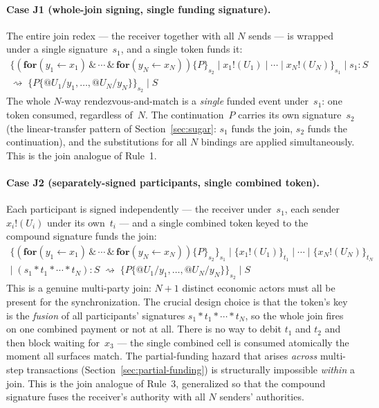 \documentclass[11pt,a4paper]{article}
\makeatletter
\newcommand{\Par}{\mathbin{|}}
\newcommand{\forc}{\mathbf{for}}
\newcommand{\send}[2]{#1 !\!\left( #2 \right)}
\newcommand{\recv}[3]{\forc\!\left( #1 \leftarrow #2 \right) #3}
\newcommand{\quot}[1]{@#1}
\newcommand{\signed}[2]{\{#1\}_{#2}}
\newcommand{\comp}{\mathbin{*}}
\newcommand{\red}{\rightsquigarrow}
\makeatother
\begin{document}
\paragraph{Case J1 (whole-join signing, single funding signature).}
The entire join redex --- the receiver together with all $N$
sends --- is wrapped under a single signature~$s_1$, and a
single token funds it:
\begin{multline}
  \signed{
    (\recv{y_1}{x_1}{} \,\&\, \cdots \,\&\, \recv{y_N}{x_N}{})
    \signed{P}{s_2}
    \Par \send{x_1}{U_1} \Par \cdots \Par \send{x_N}{U_N}
  }{s_1}
  \Par s_1 : S
  \\
  \red\;
  \signed{P\{\quot{U_1}/y_1, \ldots, \quot{U_N}/y_N\}}{s_2}
  \Par S
  \label{eq:join-J1}
\end{multline}
The whole $N$-way rendezvous-and-match is a \emph{single}
funded event under~$s_1$: one token consumed, regardless
of~$N$.  The continuation~$P$ carries its own
signature~$s_2$ (the linear-transfer pattern of
Section~\ref{sec:sugar}: $s_1$ funds the join, $s_2$ funds the
continuation), and the substitutions for all $N$ bindings are
applied simultaneously.  This is the join analogue of Rule~1.

\paragraph{Case J2 (separately-signed participants, single combined token).}
Each participant is signed independently --- the receiver
under~$s_1$, each sender~$\send{x_i}{U_i}$ under its own~$t_i$
--- and a single combined token keyed to the compound signature
funds the join:
\begin{multline}
  \signed{
    (\recv{y_1}{x_1}{} \,\&\, \cdots \,\&\, \recv{y_N}{x_N}{})
    \signed{P}{s_2}
  }{s_1}
  \Par \signed{\send{x_1}{U_1}}{t_1} \Par \cdots
  \Par \signed{\send{x_N}{U_N}}{t_N}
  \\
  \Par\; (s_1 \comp t_1 \comp \cdots \comp t_N) : S
  \;\red\;
  \signed{P\{\quot{U_1}/y_1, \ldots, \quot{U_N}/y_N\}}{s_2}
  \Par S
  \label{eq:join-J2}
\end{multline}
This is a genuine multi-party join: $N+1$ distinct economic
actors must all be present for the synchronization.  The
crucial design choice is that the token's key is the
\emph{fusion} of all participants' signatures
$s_1 \comp t_1 \comp \cdots \comp t_N$, so the whole join
fires on one combined payment or not at all.  There is no way
to debit $t_1$ and $t_2$ and then block waiting for~$x_3$ ---
the single combined cell is consumed atomically the moment all
surfaces match.  The partial-funding hazard that arises
\emph{across} multi-step transactions
(Section~\ref{sec:partial-funding}) is structurally impossible
\emph{within} a join.  This is the join analogue of Rule~3,
generalized so that the compound signature fuses the receiver's
authority with all $N$ senders' authorities.
\end{document}
